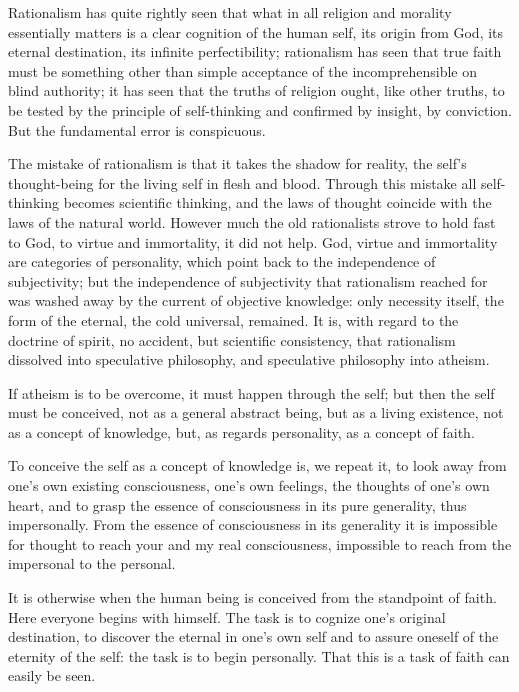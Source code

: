 \documentclass[12pt,a4paper,openany]{book}
\newcommand{\opage}[1]{\marginnote{\footnotesize\textit{[#1]}}}
\begin{document}
Rationalism has quite rightly seen that what
in all religion and morality essentially matters
is a clear cognition of the human
self, its origin from God, its eternal destination,
its infinite perfectibility; rationalism has
seen that true faith must be something other than
simple acceptance of the incomprehensible on blind authority;
it has seen that the truths of religion ought, like
other truths, to be tested by the principle of self-thinking
and confirmed by insight, by conviction.
But the fundamental error is conspicuous.

The mistake of rationalism is that it takes the shadow
for reality, the self's thought-being for the living
self in flesh and blood. Through this mistake all self-thinking
becomes scientific thinking, and the laws
of thought coincide with the laws of the natural world.
However much the old rationalists strove to
hold fast to God, to virtue and immortality, it
did not help. God, virtue and immortality are categories of personality,
which point back to the independence
of subjectivity; but the independence of subjectivity
that rationalism reached for was washed away by
the current of objective knowledge: only necessity itself,
\setcounter{footnote}{0}%
\opage{615}the form of the eternal, the cold universal, remained. It
is, with regard to the doctrine of spirit, no accident, but
scientific consistency, that rationalism dissolved
into speculative philosophy, and speculative philosophy into
atheism.

If atheism is to be overcome, it must happen through the self;
but then the self must be conceived, not as a general
abstract being, but as a living existence,
not as a concept of knowledge, but, as regards personality,
as a concept of faith.

To conceive the self as a concept of knowledge is, we repeat
it, to look away from one's own existing consciousness,
one's own feelings, the thoughts of one's own heart, and to grasp
the essence of consciousness in its pure generality, thus
impersonally. From the essence of consciousness in its generality
it is impossible for thought to reach your and
my real consciousness, impossible to reach from the impersonal
to the personal.

It is otherwise when the human being is conceived
from the standpoint of faith. Here everyone begins with himself.
The task is to cognize one's original destination,
to discover the eternal in one's own self and to assure oneself
of the eternity of the self: the task is to begin personally.
That this is a task of faith can easily be seen.
\end{document}
